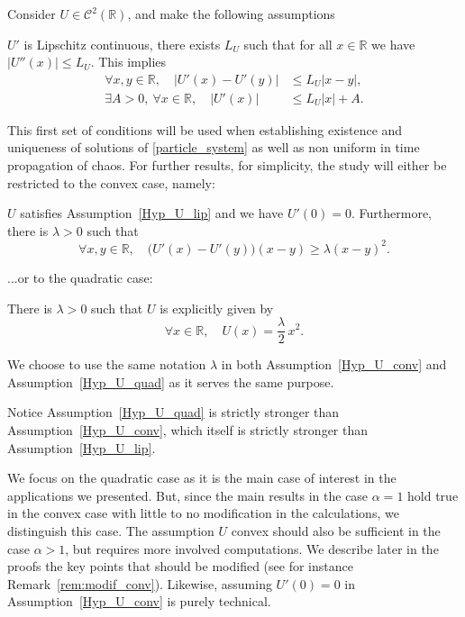 Consider $U\in\mathcal{C}^2(\mathbb{R})$, and make the following assumptions
\begin{assumption}\label{Hyp_U_lip}
$U'$ is Lipschitz continuous, \ie there exists $L_U$ such that for all $x\in\mathbb{R}$ we have $\left|U''(x)\right|\leq L_U$. This implies\vspace*{-3pt}
\begin{align*}
\forall x,y\in\mathbb{R},\quad \left|U'(x)-U'(y)\right|&\leq L_U|x-y|,
\\
\tag*{and}
\exists A>0,\ \forall x\in\mathbb{R},\quad \left|U'(x)\right|&\leq L_U| x|+A.
\end{align*}
\end{assumption}
This first set of conditions will be used when establishing existence and uniqueness of solutions of \eqref{particle_system} as well as non uniform in time propagation of chaos. For further results, for simplicity, the study will either be restricted to the convex case, namely:

\begin{assumption}\label{Hyp_U_conv}$U$ satisfies Assumption~\ref{Hyp_U_lip} and we have $U'(0)=0$. Furthermore,
there is $\lambda>0$ such that\vspace*{-3pt}
\[
\forall x,y\in\mathbb{R},\quad \bigl(U'(x)-U'(y)\bigr)(x-y)\geq \lambda(x-y)^2.
\]
\end{assumption}
\noindent
...or to the quadratic case:
\begin{assumption}\label{Hyp_U_quad}
There is $\lambda>0$ such that $U$ is explicitly given by\vspace*{-3pt}
\[
\forall x\in\mathbb{R},\quad U(x)=\frac{\lambda}{2}\,x^2.
\]
\end{assumption}
We choose to use the same notation $\lambda$ in both Assumption~\ref{Hyp_U_conv} and Assumption~\ref{Hyp_U_quad} as it serves the same purpose.

Notice Assumption~\ref{Hyp_U_quad} is strictly stronger than Assumption~\ref{Hyp_U_conv}, which itself is strictly stronger than Assumption~\ref{Hyp_U_lip}.

We focus on the quadratic case as it is the main case of interest in the applications we presented. But, since the main results in the case $\alpha=1$ hold true in the convex case with little to no modification in the calculations, we distinguish this case. The assumption $U$ convex should also be sufficient in the case $\alpha>1$, but requires more involved computations. We describe later in the proofs the key points that should be modified (see for instance Remark~\ref{rem:modif_conv}). Likewise, assuming $U'(0)=0$ in Assumption~\ref{Hyp_U_conv} is purely technical.

